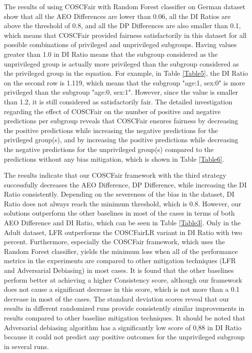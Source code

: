  The results of using COSCFair with Random Forest classifier on German dataset show that all the AEO Differences are lower than 0.06, all the DI Ratios are above the threshold of 0.8, and all the DP Differences are also smaller than 0.1, which means that COSCFair provided fairness satisfactorily in this dataset for all possible combinations of privileged and unprivileged subgroups. Having values greater than 1.0 in DI Ratio means that the subgroup considered as the unprivileged group is actually more privileged than the subgroup considered as the privileged group in the equation. For example, in Table \ref{Table5}, the DI Ratio on the second row is 1.119, which means that the subgroup "age:1, sex:0" is more privileged than the subgroup "age:0, sex:1". However, since the value is smaller than 1.2, it is still considered as satisfactorily fair. The detailed investigation regarding the effect of COSCFair on the number of positive and negative predictions per subgroup reveals that COSCFair ensures fairness by decreasing the positive predictions while increasing the negative predictions for the privileged group(s), and by increasing the positive predictions while decreasing the negative predictions for the unprivileged group(s) compared to the predictions without any bias mitigation, which is shown in Table \ref{Table6}.

 The results indicate that our COSCFair framework with the third strategy successfully decreases the AEO Difference, DP Difference, while increasing the DI Ratio consistently. Depending on the severeness of the bias in the dataset, DI Ratio does not always reach the minimum threshold, which is 0.8. However, our solutions outperform the other baselines in most of the cases in terms of both AEO Difference and DI Ratio, which can be seen in Table \ref{Table3}. Only in the Adult dataset, LFR outperforms the COSCFairLR variant in DI Ratio with two percent. Furthermore, especially the COSCFair framework, which uses the Random Forest classifier, yields the minimum loss when all of the performance metrics in the experiments are compared to other mitigation techniques (LFR and Adversarial Debiasing) in most cases. It is found that the other baselines perform better at achieving a higher Consistency score, although our framework does not cause a significant decrease in this score, which is not more than a 0.1 decrease in most of the cases. The standard deviation scores reveal that our results in different randomized runs provide consistently similar improvements in results compared to other baseline mitigation techniques. It should be noted that Adversarial debiasing algorithm has a significantly low score of 0,88 in DI Ratio because it could not predict any positive outcomes for the unprivileged subgroup in several runs.








